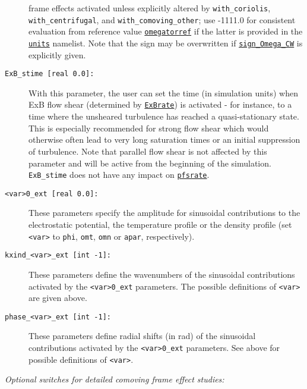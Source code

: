 \documentclass[12pt]{article}
\begin{document}
\begin{description}
frame effects activated unless explicitly altered by {\tt with\_coriolis}, {\tt with\_centrifugal}, and {\tt with\_comoving\_other};
use -1111.0 for consistent evaluation from reference value \hyperlink{omegatorref}{\tt omegatorref} if the latter is provided in the \hyperlink{units_nml}{\tt units} namelist. Note that the sign may be overwritten if \hyperlink{sign_Omega_CW}{\tt sign\_Omega\_CW} is explicitly given.
\item[\hypertarget{ExB_stime}{\tt ExB\_stime [real 0.0]:}] With this parameter, the   user can set the time (in simulation units)
  when ExB flow shear (determined by \hyperlink{ExBrate}{\tt ExBrate}) is activated - for instance, to a time where the unsheared turbulence has reached a quasi-stationary
  state. This is especially recommended for strong flow shear which would otherwise
  often lead to very long saturation times or an initial suppression of turbulence.
  Note that parallel flow shear is not affected by this parameter and will be active from the beginning of the simulation. {\tt ExB\_stime} does not have any impact on \hyperlink{pfsrate}{\tt pfsrate}.
\item[\texttt{<var>0\_ext [real 0.0]:}] These parameters specify the amplitude for sinusoidal contributions to
  the electrostatic potential, the temperature profile or the density profile (set \texttt{<var>} to \texttt{phi},
  \texttt{omt}, \texttt{omn} or \texttt{apar}, respectively).
\item[\texttt{kxind\_<var>\_ext [int -1]:}] These parameters define the wavenumbers of the sinusoidal
  contributions activated by the \texttt{<var>0\_ext} parameters. The possible definitions of \texttt{<var>}
  are given above.
\item[\texttt{phase\_<var>\_ext [int -1]:}] These parameters define radial shifts (in rad) of the sinusoidal
  contributions activated by the \texttt{<var>0\_ext} parameters. See above for possible definitions of \texttt{<var>}.
\end{description}
{\em Optional switches for detailed comoving frame effect studies:}
\end{document}
